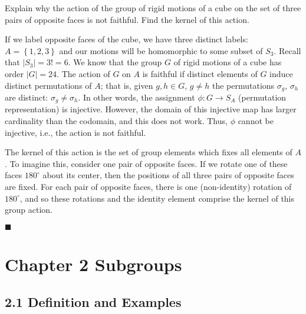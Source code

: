 \documentclass[12pt]{article}
\renewcommand{\qed}{\hfill$\blacksquare$}
\renewenvironment{proof}{\begin{addmargin}[1em]{0em}\begin{newproof}}{\end{newproof}\end{addmargin}\qed}
\newenvironment{problem}[2][Exercise]{\begin{trivlist}
\item[\hskip \labelsep {\bfseries #1}\hskip \labelsep {\bfseries #2.}]}{\end{trivlist}}
\begin{document}
\begin{problem}{1.7.23}
Explain why the action of the group of rigid motions of a cube on the set of three pairs of opposite faces is not faithful. Find the kernel of this action.
\end{problem}
\begin{proof}
If we label opposite faces of the cube, we have three distinct labels: $A=\left\{1,2,3\right\}$ and our motions will be homomorphic to some subset of $S_3$. Recall that $\left|S_3\right|=3!=6$. We know that the group $G$ of rigid motions of a cube has order $\left|G\right|=24$. The action of $G$ on $A$ is faithful if distinct elements of $G$ induce distinct permutations of $A$; that is, given $g,h\in G$, $g\neq h$ the permutations $\sigma_g$, $\sigma_h$ are distinct: $\sigma_g\neq \sigma_h$. In other words, the assignment $\phi:G\rightarrow S_A$ (permutation representation) is injective. However, the domain of this injective map has larger cardinality than the codomain, and this does not work. Thus, $\phi$ cannot be injective, i.e., the action is not faithful.

The kernel of this action is the set of group elements which fixes all elements of $A$. To imagine this, consider one pair of opposite faces. If we rotate one of these faces $180^{\circ}$ about its center, then the positions of all three pairs of opposite faces are fixed. For each pair of opposite faces, there is one (non-identity) rotation of $180^{\circ}$, and so these rotations and the identity element comprise the kernel of this group action.
\end{proof}















\newpage
\section*{Chapter 2 Subgroups}

\subsection*{2.1 Definition and Examples}
\end{document}
